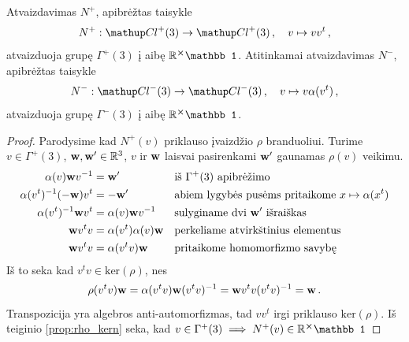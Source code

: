 \begin{proposition}
	Atvaizdavimas $N^+$, apibrėžtas taisykle 
	\begin{equation}
		N^+: \Clp \to \Clp
		\,,\quad
		v \mapsto vv^t
		\,,
	\end{equation}
	atvaizduoja grupę $\Gamma^+(3)$ į aibę $\set R^{\cross}\mathbb1$. 
	Atitinkamai atvaizdavimas $N^-$, apibrėžtas taisykle 
	\begin{equation}
		N^-: \Clm \to \Clm
		\,,\quad
		v \mapsto v\alpha(v^t)
		\,,
	\end{equation}
	atvaizduoja grupę $\Gamma^-(3)$ į aibę $\set R^{\cross}\mathbb1$. 
\end{proposition}
\begin{proof}
	Parodysime kad $N^+(v)$ priklauso įvaizdžio $\rho$ branduoliui.
	Turime $v \in \Gamma^+(3)$, $\vb w, \vb w' \in \mathbb{R}^3$,
	$v$ ir $\vb w$ laisvai pasirenkami $\vb w'$ gaunamas $\rho(v)$ veikimu.
	\begin{equation}
		\begin{aligned}
			\alpha(v)\vb w v^{-1} &= \vb w'
			&&\text{iš $\Gamma^+(3)$ apibrėžimo}
			\\
			\alpha(v^t)^{-1}  (-\vb w)  v^t &= -\vb w'
			&&\text{abiem lygybės pusėms pritaikome $x \mapsto \alpha(x^t)$}
			\\
			\alpha(v^t)^{-1}  \vb w  v^t &= \alpha(v)\vb w v^{-1}
			&&\text{sulyginame dvi $\vb w'$ išraiškas}
			\\
			\vb w  v^t v&= \alpha(v^t)\alpha(v)\vb w 
			&&\text{perkeliame atvirkštinius elementus}
			\\
			\vb w  v^t v&= \alpha(v^t v)\vb w 
			&&\text{pritaikome homomorfizmo savybę}
		\end{aligned}
	\end{equation}
	Iš to seka kad $v^t v \in \mathup{ker}(\rho)$, nes
	\begin{equation}
		\rho(v^t v)\vb w 
		= \alpha(v^t v)\vb w (v^t v)^{-1}
		= \vb w  v^t v (v^t v)^{-1}
		= \vb w 
		\,.
	\end{equation}
	Transpozicija yra algebros anti-automorfizmas,
	tad $v v^t$ irgi priklauso $\mathup{ker}(\rho)$.
	Iš teiginio \ref{prop:rho_kern} seka,
	kad $v \in \Gamma^+(3) \implies N^+(v) \in \set R^{\cross} \mathbb1 $ 


\end{proof}
